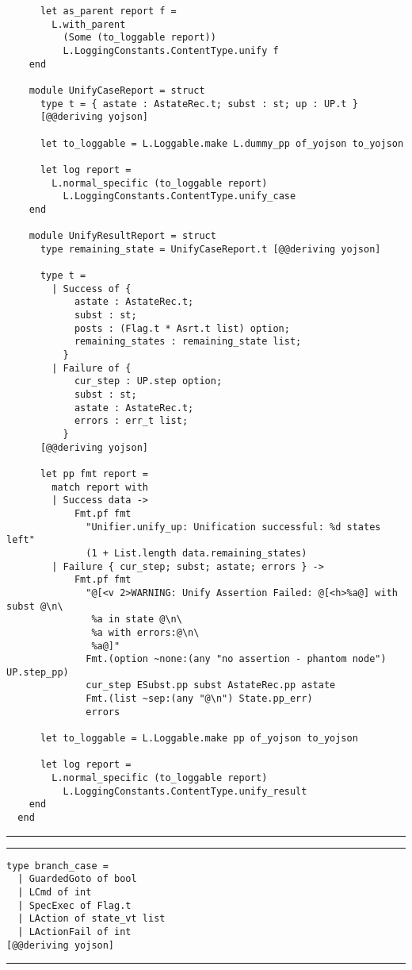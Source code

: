\begin{verbatim}
      let as_parent report f =
        L.with_parent
          (Some (to_loggable report))
          L.LoggingConstants.ContentType.unify f
    end

    module UnifyCaseReport = struct
      type t = { astate : AstateRec.t; subst : st; up : UP.t }
      [@@deriving yojson]

      let to_loggable = L.Loggable.make L.dummy_pp of_yojson to_yojson

      let log report =
        L.normal_specific (to_loggable report)
          L.LoggingConstants.ContentType.unify_case
    end

    module UnifyResultReport = struct
      type remaining_state = UnifyCaseReport.t [@@deriving yojson]

      type t =
        | Success of {
            astate : AstateRec.t;
            subst : st;
            posts : (Flag.t * Asrt.t list) option;
            remaining_states : remaining_state list;
          }
        | Failure of {
            cur_step : UP.step option;
            subst : st;
            astate : AstateRec.t;
            errors : err_t list;
          }
      [@@deriving yojson]

      let pp fmt report =
        match report with
        | Success data ->
            Fmt.pf fmt
              "Unifier.unify_up: Unification successful: %d states left"
              (1 + List.length data.remaining_states)
        | Failure { cur_step; subst; astate; errors } ->
            Fmt.pf fmt
              "@[<v 2>WARNING: Unify Assertion Failed: @[<h>%a@] with subst @\n\
               %a in state @\n\
               %a with errors:@\n\
               %a@]"
              Fmt.(option ~none:(any "no assertion - phantom node") UP.step_pp)
              cur_step ESubst.pp subst AstateRec.pp astate
              Fmt.(list ~sep:(any "@\n") State.pp_err)
              errors

      let to_loggable = L.Loggable.make pp of_yojson to_yojson

      let log report =
        L.normal_specific (to_loggable report)
          L.LoggingConstants.ContentType.unify_result
    end
  end
\end{verbatim}
\vspace{-0.4cm}
\noindent\rule{\textwidth}{0.5pt}
\vspace{-0.6cm}
%
\label{lst:unifier-logging}

\vspace{2em}
\noindent\rule{\textwidth}{0.5pt}
\vspace{-0.6cm}
\begin{verbatim}
type branch_case =
  | GuardedGoto of bool
  | LCmd of int
  | SpecExec of Flag.t
  | LAction of state_vt list
  | LActionFail of int
[@@deriving yojson]
\end{verbatim}
\vspace{-0.4cm}
\noindent\rule{\textwidth}{0.5pt}
\vspace{-0.6cm}
%
\label{lst:branch-case}


